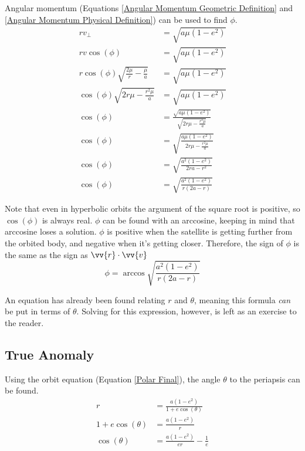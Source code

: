 \documentclass{article}
\begin{document}
Angular momentum (Equations \eqref{Angular Momentum Geometric Definition} and \eqref{Angular Momentum Physical Definition}) can be used to find $\phi$.
\begin{align*}
    rv_\perp                                       & = \sqrt{a\mu(1-e^2)}                                       \\
    rv\cos(\phi)                                   & = \sqrt{a\mu(1-e^2)}                                       \\
    r\cos(\phi)\sqrt{\frac{2\mu}{r}-\frac{\mu}{a}} & = \sqrt{a\mu(1-e^2)}                                       \\
    \cos(\phi)\sqrt{2r\mu-\frac{r^2\mu}{a}}        & = \sqrt{a\mu(1-e^2)}                                       \\
    \cos(\phi)                                     & = \frac{\sqrt{a\mu(1-e^2)}}{\sqrt{2r\mu-\frac{r^2\mu}{a}}} \\
    \cos(\phi)                                     & = \sqrt{\frac{a\mu(1-e^2)}{2r\mu-\frac{r^2\mu}{a}}}        \\
    \cos(\phi)                                     & = \sqrt{\frac{a^2(1-e^2)}{2ra-r^2}}                        \\
    \cos(\phi)                                     & = \sqrt{\frac{a^2(1-e^2)}{r(2a-r)}}
\end{align*}

Note that even in hyperbolic orbits the argument of the square root is positive, so $\cos(\phi)$ is always real. $\phi$ can be found with an arccosine, keeping in mind that arccosine loses a solution. $\phi$ is positive when the satellite is getting further from the orbited body, and negative when it's getting closer. Therefore, the sign of $\phi$ is the same as the sign as $\vv{r}\cdot\vv{v}$
\begin{equation}\label{Flight Path Angle}
    \phi=\arccos{\sqrt{\frac{a^2(1-e^2)}{r(2a-r)}}}
\end{equation}


An equation has already been found relating $r$ and $\theta$, meaning this formula \textit{can} be put in terms of $\theta$. Solving for this expression, however, is left as an exercise to the reader.

\bigskip\bigskip
\subsection{True Anomaly}
Using the orbit equation (Equation \eqref{Polar Final}), the angle $\theta$ to the periapsis can be found.
\begin{align*}
    r               & =\frac{a(1-e^2)}{1+e\cos(\theta)} \\
    1+e\cos(\theta) & =\frac{a(1-e^2)}{r}               \\
    \cos(\theta)    & =\frac{a(1-e^2)}{er}-\frac{1}{e}  \\
\end{align*}
\end{document}
